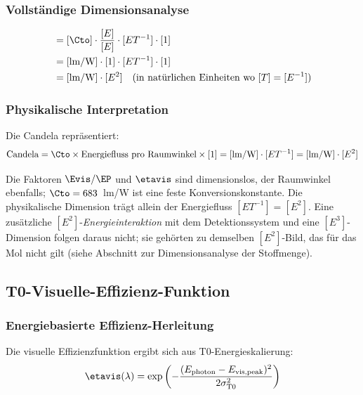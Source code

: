 	\subsubsection{Vollständige Dimensionsanalyse}
	\label{subsubsec:candela_vollstaendige_dimensional}
	
	\begin{align}
		[I_{\text{T0}}] &= [\Cto] \cdot \frac{[E]}{[E]} \cdot [E T^{-1}] \cdot [1] \\
		&= [\text{lm/W}] \cdot [1] \cdot [E T^{-1}] \cdot [1] \\
		&= [\text{lm/W}] \cdot [E^2] \quad \text{(in natürlichen Einheiten wo } [T] = [E^{-1}])
		\label{eq:candela_dimensionsanalyse}
	\end{align}
	
	\subsubsection{Physikalische Interpretation}
	\label{subsubsec:candela_physikalische_interpretation}
	
	Die Candela repräsentiert:
	\begin{equation}
		\text{Candela} = \Cto \times \text{Energiefluss pro Raumwinkel} \times [1] = [\text{lm/W}] \cdot [E T^{-1}] = [\text{lm/W}] \cdot [E^2]
		\label{eq:candela_interpretation}
	\end{equation}
	
	Die Faktoren $\Evis/\EP$ und $\etavis$ sind dimensionslos, der Raumwinkel ebenfalls; $\Cto = 683$~lm/W ist eine feste Konversionskonstante. Die physikalische Dimension trägt allein der Energiefluss $[E T^{-1}] = [E^2]$. Eine zusätzliche $[E^2]$-\emph{Energieinteraktion} mit dem Detektionssystem und eine $[E^3]$-Dimension folgen daraus nicht; sie gehörten zu demselben $[E^2]$-Bild, das für das Mol nicht gilt (siehe Abschnitt zur Dimensionsanalyse der Stoffmenge).
	
	\subsection{T0-Visuelle-Effizienz-Funktion}
	\label{subsec:t0_visuelle_effizienz}
	
	\subsubsection{Energiebasierte Effizienz-Herleitung}
	\label{subsubsec:energie_effizienz_herleitung}
	
	Die visuelle Effizienzfunktion ergibt sich aus T0-Energieskalierung:
	\begin{equation}
		\etavis(\lambda) = \exp\left(-\frac{(E_{\text{photon}} - E_{\text{vis,peak}})^2}{2\sigma_{\text{T0}}^2}\right)
		\label{eq:t0_visuelle_effizienz}
	\end{equation}
	

